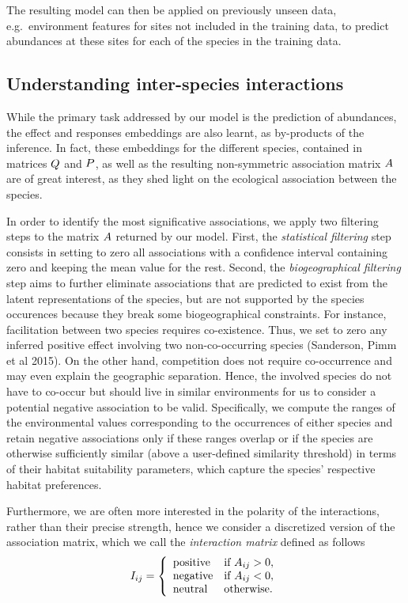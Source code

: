 \documentclass[10pt,a4paper]{article}
\begin{document}
The resulting model can then be applied on previously unseen data, e.g.\ environment features for sites not included in the training data, to predict abundances at these sites for each of the species in the training data.

\subsection{Understanding inter-species interactions}
While the primary task addressed by our model is the prediction of abundances, the effect and responses embeddings are also learnt, as by-products of the inference.
In fact, these embeddings for the different species, contained in matrices $Q$ and $P$, as well as the resulting non-symmetric association matrix $A$ are of great interest, as they shed light on the ecological association between the species.

In order to identify the most significative associations, we apply two filtering steps to the matrix $A$ returned by our model.
First, the \emph{statistical filtering} step consists in setting to zero all associations with a confidence interval containing zero and keeping the mean value for the rest. Second, the \emph{biogeographical filtering} step aims to further eliminate associations that are predicted to exist from the latent representations of the species, but are not supported by the species occurences because they break some biogeographical constraints. For instance, facilitation between two species requires co-existence. Thus, we set to zero any inferred positive effect involving two non-co-occurring species (Sanderson, Pimm et al 2015). On the other hand, competition does not require co-occurrence and may even explain the geographic separation. Hence, the involved species do not have to co-occur but should live in similar environments for us to consider a potential negative association to be valid. Specifically, we compute the ranges of the environmental values corresponding to the occurrences of either species and retain negative associations only if these ranges overlap or if the species are otherwise sufficiently similar (above a user-defined similarity threshold) in terms of their habitat suitability parameters, which capture the species' respective habitat preferences. 

Furthermore, we are often more interested in the polarity of the interactions, rather than their precise strength, hence we consider a discretized version of the association matrix, which we call the \emph{interaction matrix} defined as follows
\begin{equation*}
I_{ij} =  \left\{
\begin{array}{ll}
\text{positive} & \mbox{if } A_{ij}>0, \\
\text{negative} & \mbox{if } A_{ij}<0, \\
\text{neutral} & \mbox{otherwise.}
\end{array}
\right.
\end{equation*}
\end{document}
